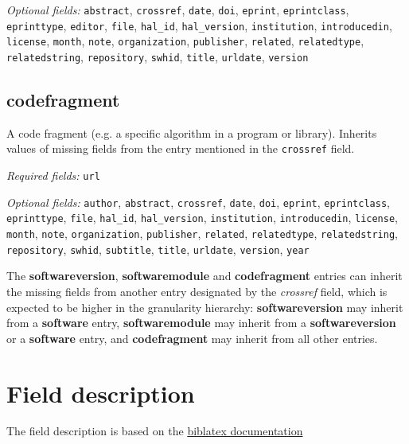 \emph{Optional fields:} \texttt{abstract}, \texttt{crossref}, \texttt{date}, \texttt{doi}, \texttt{eprint}, \texttt{eprintclass}, \texttt{eprinttype}, \texttt{editor}, \texttt{file}, \texttt{hal\_id}, \texttt{hal\_version},
\texttt{institution}, \texttt{introducedin}, \texttt{license}, \texttt{month}, \texttt{note}, \texttt{organization}, \texttt{publisher},
\texttt{related}, \texttt{relatedtype}, \texttt{relatedstring}, \texttt{repository}, \texttt{swhid}, \texttt{title}, \texttt{urldate}, \texttt{version}

\subsection{codefragment}

A code fragment (e.g. a specific algorithm in a program or library).
Inherits values of missing fields from the entry mentioned in the \texttt{crossref} field.

\emph{Required fields:}  \texttt{url}

\emph{Optional fields:} \texttt{author}, \texttt{abstract}, \texttt{crossref}, \texttt{date}, \texttt{doi}, \texttt{eprint}, \texttt{eprintclass}, \texttt{eprinttype}, \texttt{file}, \texttt{hal\_id}, \texttt{hal\_version},
\texttt{institution}, \texttt{introducedin}, \texttt{license}, \texttt{month}, \texttt{note}, \texttt{organization}, \texttt{publisher},
\texttt{related}, \texttt{relatedtype}, \texttt{relatedstring}, \texttt{repository}, \texttt{swhid}, \texttt{subtitle}, \texttt{title}, \texttt{urldate}, \texttt{version}, \texttt{year}

The \textbf{softwareversion}, \textbf{softwaremodule} and \textbf{codefragment} entries can inherit
the missing fields from another entry designated by the \emph{crossref} field, which
is expected to be higher in the granularity hierarchy: \textbf{softwareversion} may
inherit from a \textbf{software} entry, \textbf{softwaremodule} may inherit from a
\textbf{softwareversion} or a \textbf{software} entry, and \textbf{codefragment} may inherit from all
other entries.

\section{Field description}
The field description is based on the \href{http://mirrors.ibiblio.org/CTAN/macros/latex/exptl/biblatex/doc/biblatex.pdf}{biblatex documentation}
